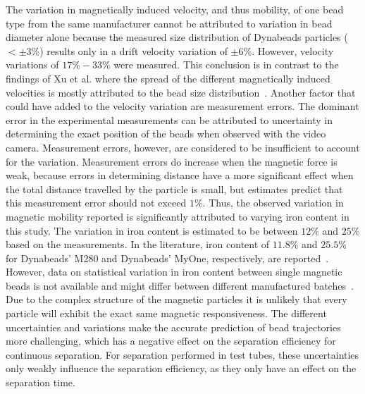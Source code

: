 The variation in magnetically induced velocity, and thus mobility, of one bead type from the same manufacturer cannot be attributed to variation in bead diameter alone because the measured size distribution of Dynabeads particles ($<\pm3\%$) results only in a drift velocity variation of $\pm6\%$. However, velocity variations of $17\% - 33\%$ were measured. This conclusion is in contrast to the findings of Xu et al. where the spread of the different magnetically induced velocities is mostly attributed to the bead size distribution~\cite{Xu2012}. Another factor that could have added to the velocity variation are measurement errors. The dominant error in the experimental measurements can be attributed to uncertainty in determining the exact position of the beads when observed with the video camera. Measurement errors, however, are considered to be insufficient to account for the variation. Measurement errors do increase when the magnetic force is weak, because errors in determining distance have a more significant effect when the total distance travelled by the particle is small, but estimates predict that this measurement error should not exceed $1\%$. Thus, the observed variation in magnetic mobility reported is significantly attributed to varying iron content in this study. The variation in iron content is estimated to be between $12\%$ and $25\%$ based on the measurements. In the literature, iron content of $11.8\%$ and $25.5\%$ for Dynabeads' M280 and Dynabeads' MyOne, respectively, are reported~\cite{Fonnum2005}. However, data on statistical variation in iron content between single magnetic beads is not available and might differ between different manufactured batches~\cite{Ommering2006}. Due to the complex structure of the magnetic particles it is unlikely that every particle will exhibit the exact same magnetic responsiveness. The different uncertainties and variations make the accurate prediction of bead trajectories more challenging, which has a negative effect on the separation efficiency for continuous separation. For separation performed in test tubes, these uncertainties only weakly influence the separation efficiency, as they only have an effect on the separation time.

